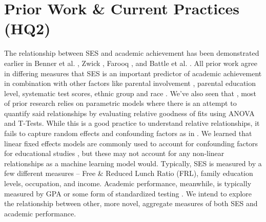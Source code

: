 \documentclass[sigconf,nonacm,11pt]{acmart}
\begin{document}
\section{Prior Work \& Current Practices (HQ2)}
The relationship between SES and academic achievement has been demonstrated earlier in Benner et al. \cite{parentalinvolvement}, Zwick \cite{collegescores}, Farooq \cite{farooq}, and Battle et al. \cite{raceses}. All prior work agree in differing measures that SES is an important predictor of academic achievement in combination with other factors like parental involvement \cite{parentalinvolvement}, parental education level\cite{farooq}, systematic test scores\cite{sirin}, ethnic group \cite{collegescores} and race \cite{raceses}. We've also seen that \cite{parentalinvolvement, collegescores, raceses, farooq}, most of prior research relies on parametric models where there is an attempt to quantify said relationships by evaluating relative goodness of fits using ANOVA and T-Tests. While this is a good practice to understand relative relationships, it fails to capture random effects and confounding factors as in \cite{collegescores, raceses}. We learned that linear fixed effects models are commonly used to account for confounding factors for educational studies \cite{jinnai, winters, harris}, but these may not account for any non-linear relationships as a machine learning model would. Typically, SES is measured by a few different measures -- Free \& Reduced Lunch Ratio (FRL)\cite{sirin}, family education levels\cite{farooq}, occupation, and income.  Academic performance, meanwhile, is typically measured by GPA or some form of standardized testing \cite{sirin}. We intend to explore the relationship between other, more novel, aggregate measures of both SES and academic performance.
\end{document}
